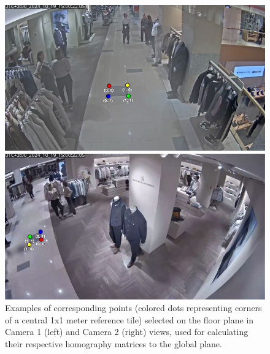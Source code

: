 \documentclass[12pt, a4paper]{article}
\begin{document}
\begin{figure}[H]
    \centering
    \begin{minipage}{0.48\linewidth}
        \centering
        \includegraphics[width=\linewidth]{pictures/keypoints1.png} %
    \end{minipage}
    \hfill %
    \begin{minipage}{0.48\linewidth}
        \centering
        \includegraphics[width=\linewidth]{pictures/keypoints2.png} %
    \end{minipage}
    \caption{Examples of corresponding points (colored dots representing corners of a central 1x1 meter reference tile) selected on the floor plane in Camera 1 (left) and Camera 2 (right) views, used for calculating their respective homography matrices to the global plane.}
    \label{fig:homography_points_pair}
\end{figure}
\end{document}
